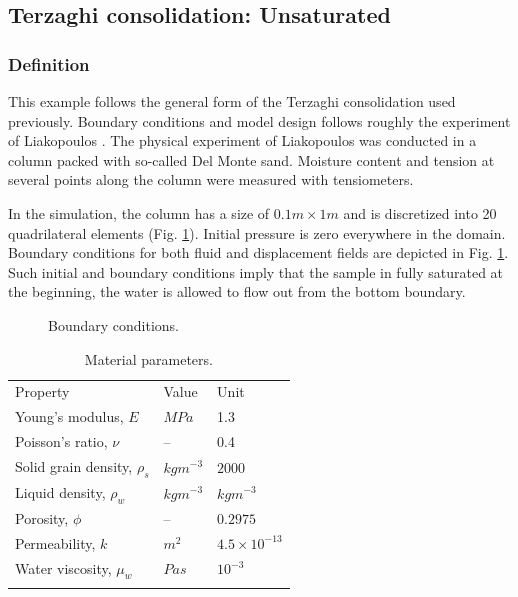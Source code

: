 \subsection{Terzaghi consolidation: Unsaturated}

\subsubsection*{Definition}
This example follows the general form of the Terzaghi consolidation used previously. Boundary conditions and model design follows roughly the experiment of Liakopoulos \cite{Lia:65}. The physical experiment of Liakopoulos was conducted in a column packed with so-called Del Monte sand. Moisture content and tension at several points along the column were measured with tensiometers.

In the simulation, the column has a size of $0.1m\times1m$ and is discretized into 20 quadrilateral elements (Fig. \ref{fig:modelia}). Initial pressure is zero everywhere in the domain. Boundary conditions for both fluid and displacement fields are depicted in Fig. \ref{fig:modelia}. Such initial and boundary conditions imply that the sample in fully saturated at the beginning, the water is allowed to flow out from the bottom boundary.

\vspace{0.5cm}
\begin{figure}[!t]
\begin{center}

\end{center}
\caption{Boundary conditions.}
\label{fig:modelia}
\end{figure}

\begin{table}[!htb]
\centering
\begin{tabular}{lll}
\hline\noalign{\smallskip}
Property & Value & Unit \\
\noalign{\smallskip}\hline\noalign{\smallskip}
Young's modulus, $E$  &  $MPa$   &  1.3   \\
Poisson's ratio,  $\nu$  & -- &  0.4 \\
Solid grain density, $\rho _s$  &$kg m^{-3}$ & $2000$ \\
Liquid density, $\rho _w$       &$kg m^{-3}$ & $kg m^{-3}$ \\
Porosity, $\phi$            & --  & $0.2975$ \\
Permeability, $k$         & $ m^2$     & $4.5\times 10^{-13}$ \\
Water viscosity,  $\mu _w$      & $Pa s$     & $10^{-3} $ \\
\noalign{\smallskip}
\hline
\end{tabular}
\caption{Material parameters.}
\label{tab:hm_sat}
\end{table}


